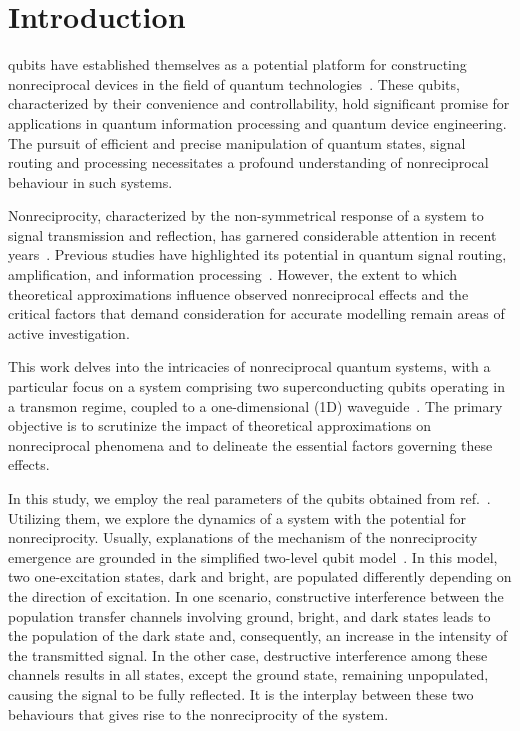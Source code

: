 \documentclass[lettersize,journal]{IEEEtran}
\begin{document}
\section{Introduction}

 qubits have established themselves as a potential platform for constructing nonreciprocal devices in the field of quantum technologies~\cite{rosario_hamann_nonreciprocity_2018, gheeraert2020programmable, rymarz2021hardware, kutsaev2021up, redchenko2023tunable}. These qubits, characterized by their convenience and controllability, hold significant promise for applications in quantum information processing and quantum device engineering. The pursuit of efficient and precise manipulation of quantum states, signal routing and processing necessitates a profound understanding of nonreciprocal behaviour in such systems.

Nonreciprocity, characterized by the non-symmetrical response of a system to signal transmission and reflection, has garnered considerable attention in recent years~\cite{caloz2018electromagnetic,nassar2020nonreciprocity,manipatruni2009optical, mahoney2017chip,zhang2018thermal, rosario_hamann_nonreciprocity_2018, nefedkin_nonreciprocal_2023}. Previous studies have highlighted its potential in quantum signal routing, amplification, and information processing~\cite{Furnkranz2020Quantum, Kimble2008quantum}. However, the extent to which theoretical approximations influence observed nonreciprocal effects and the critical factors that demand consideration for accurate modelling remain areas of active investigation.

This work delves into the intricacies of nonreciprocal quantum systems, with a particular focus on a system comprising two superconducting qubits operating in a transmon regime, coupled to a one-dimensional (1D) waveguide~\cite{dai_rectification_2015, muller_nonreciprocal_2017, rosario_hamann_nonreciprocity_2018, Nefedkin2022}. The primary objective is to scrutinize the impact of theoretical approximations on nonreciprocal phenomena and to delineate the essential factors governing these effects.

In this study, we employ the real parameters of the qubits obtained from ref.~\cite{rosario_hamann_nonreciprocity_2018}. Utilizing them, we explore the dynamics of a system with the potential for nonreciprocity. Usually, explanations of the mechanism of the nonreciprocity emergence are grounded in the simplified two-level qubit model~\cite{lalumiere_input-output_2013, muller_nonreciprocal_2017}. In this model, two one-excitation states, dark and bright, are populated differently depending on the direction of excitation. In one scenario, constructive interference between the population transfer channels involving ground, bright, and dark states leads to the population of the dark state and, consequently, an increase in the intensity of the transmitted signal. In the other case, destructive interference among these channels results in all states, except the ground state, remaining unpopulated, causing the signal to be fully reflected. It is the interplay between these two behaviours that gives rise to the nonreciprocity of the system. 
\end{document}
